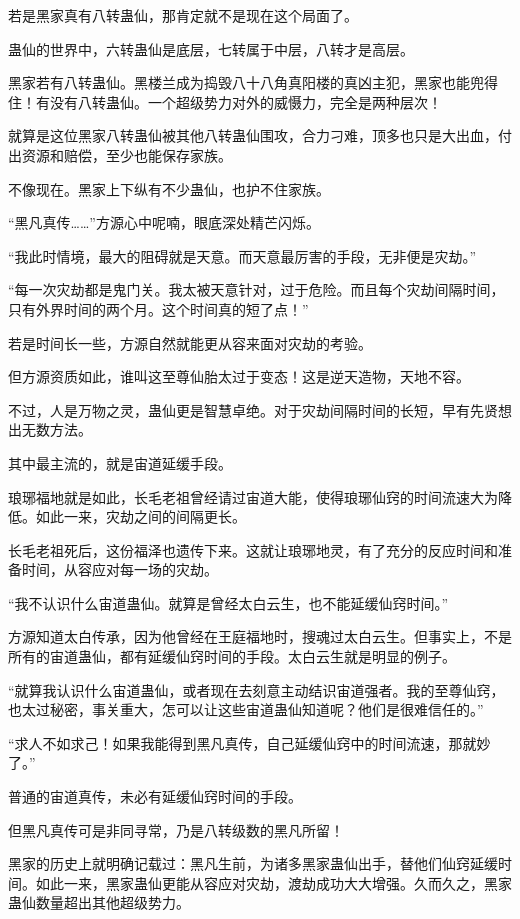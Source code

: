 \begin{this_body}
若是黑家真有八转蛊仙，那肯定就不是现在这个局面了。

蛊仙的世界中，六转蛊仙是底层，七转属于中层，八转才是高层。

黑家若有八转蛊仙。黑楼兰成为捣毁八十八角真阳楼的真凶主犯，黑家也能兜得住！有没有八转蛊仙。一个超级势力对外的威慑力，完全是两种层次！

就算是这位黑家八转蛊仙被其他八转蛊仙围攻，合力刁难，顶多也只是大出血，付出资源和赔偿，至少也能保存家族。

不像现在。黑家上下纵有不少蛊仙，也护不住家族。

“黑凡真传……”方源心中呢喃，眼底深处精芒闪烁。

“我此时情境，最大的阻碍就是天意。而天意最厉害的手段，无非便是灾劫。”

“每一次灾劫都是鬼门关。我太被天意针对，过于危险。而且每个灾劫间隔时间，只有外界时间的两个月。这个时间真的短了点！”

若是时间长一些，方源自然就能更从容来面对灾劫的考验。

但方源资质如此，谁叫这至尊仙胎太过于变态！这是逆天造物，天地不容。

不过，人是万物之灵，蛊仙更是智慧卓绝。对于灾劫间隔时间的长短，早有先贤想出无数方法。

其中最主流的，就是宙道延缓手段。

琅琊福地就是如此，长毛老祖曾经请过宙道大能，使得琅琊仙窍的时间流速大为降低。如此一来，灾劫之间的间隔更长。

长毛老祖死后，这份福泽也遗传下来。这就让琅琊地灵，有了充分的反应时间和准备时间，从容应对每一场的灾劫。

“我不认识什么宙道蛊仙。就算是曾经太白云生，也不能延缓仙窍时间。”

方源知道太白传承，因为他曾经在王庭福地时，搜魂过太白云生。但事实上，不是所有的宙道蛊仙，都有延缓仙窍时间的手段。太白云生就是明显的例子。

“就算我认识什么宙道蛊仙，或者现在去刻意主动结识宙道强者。我的至尊仙窍，也太过秘密，事关重大，怎可以让这些宙道蛊仙知道呢？他们是很难信任的。”

“求人不如求己！如果我能得到黑凡真传，自己延缓仙窍中的时间流速，那就妙了。”

普通的宙道真传，未必有延缓仙窍时间的手段。

但黑凡真传可是非同寻常，乃是八转级数的黑凡所留！

黑家的历史上就明确记载过：黑凡生前，为诸多黑家蛊仙出手，替他们仙窍延缓时间。如此一来，黑家蛊仙更能从容应对灾劫，渡劫成功大大增强。久而久之，黑家蛊仙数量超出其他超级势力。


\end{this_body}
